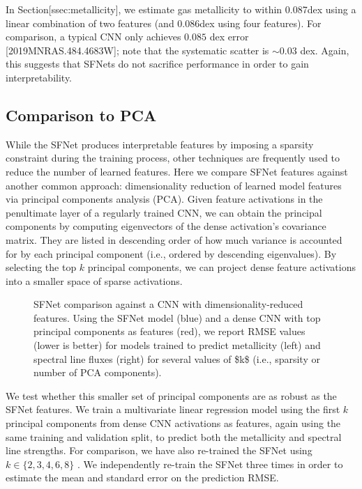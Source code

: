 \documentclass[11pt,a4paper]{article}
\begin{document}
In Section[ssec:metallicity], we estimate gas metallicity to within 0.087dex using a linear combination of two features (and 0.086dex using four features). For comparison, a typical CNN only achieves  $0.085$ dex error [2019MNRAS.484.4683W]; note that the systematic scatter is  $\sim 0.03$ dex. Again, this suggests that SFNets do not sacrifice performance in order to gain interpretability.

\subsection{Comparison to PCA}

While the SFNet produces interpretable features by imposing a sparsity constraint during the training process, other techniques are frequently used to reduce the number of learned features. Here we compare SFNet features against another common approach: dimensionality reduction of learned model features via principal components analysis (PCA). Given feature activations in the penultimate layer of a regularly trained CNN, we can obtain the principal components by computing eigenvectors of the dense activation's covariance matrix. They are listed in descending order of how much variance is accounted for by each principal component (i.e., ordered by descending eigenvalues). By selecting the top  $k$  principal components, we can project dense feature activations into a smaller space of sparse activations.

\begin{figure}[h]
\caption{SFNet comparison against a CNN with dimensionality-reduced features. Using the SFNet model (blue) and a dense CNN with top principal components as features (red), we report RMSE values (lower is better) for models trained to predict metallicity (left) and spectral line fluxes (right) for several values of  \$k\$  (i.e., sparsity or number of PCA components).}
\end{figure}

We test whether this smaller set of principal components are as robust as the SFNet features. We train a multivariate linear regression model using the first  $k$  principal components from dense CNN activations as features, again using the same training and validation split, to predict both the metallicity and spectral line strengths. For comparison, we have also re-trained the SFNet using  $k \in \{2, 3, 4, 6, 8\}$ . We independently re-train the SFNet three times in order to estimate the mean and standard error on the prediction RMSE.
\end{document}
